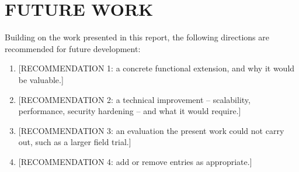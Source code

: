 \section{FUTURE WORK}
\label{sec:future-work}

Building on the work presented in this report, the following
directions are recommended for future development:

\begin{enumerate}[label=\arabic*., leftmargin=*, itemsep=2pt]
  \item {[RECOMMENDATION 1: a concrete functional extension, and why it
        would be valuable.]}
  \item {[RECOMMENDATION 2: a technical improvement -- scalability,
        performance, security hardening -- and what it would require.]}
  \item {[RECOMMENDATION 3: an evaluation the present work could not
        carry out, such as a larger field trial.]}
  \item {[RECOMMENDATION 4: add or remove entries as appropriate.]}
\end{enumerate}
